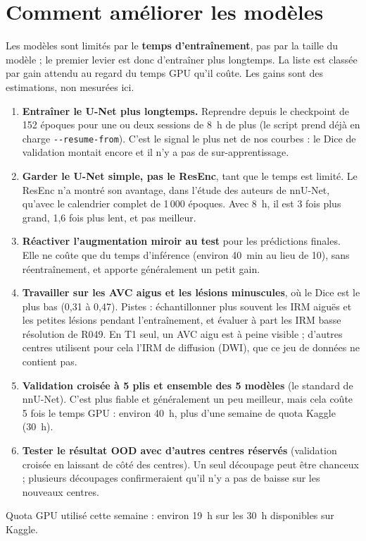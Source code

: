 \section{Comment améliorer les modèles}
\label{sec:anas-ameliorations}

Les modèles sont limités par le \textbf{temps d'entraînement}, pas par la taille du modèle ; le premier levier est donc d'entraîner plus longtemps.
La liste est classée par gain attendu au regard du temps GPU qu'il coûte.
Les gains sont des estimations, non mesurées ici.

\begin{enumerate}
  \item \textbf{Entraîner le U-Net plus longtemps.} Reprendre depuis le checkpoint de 152 époques pour une ou deux sessions de 8~h de plus (le script prend déjà en charge \texttt{-{}-resume-from}). C'est le signal le plus net de nos courbes : le Dice de validation montait encore et il n'y a pas de sur-apprentissage.
  \item \textbf{Garder le U-Net simple, pas le ResEnc}, tant que le temps est limité. Le ResEnc n'a montré son avantage, dans l'étude des auteurs de nnU-Net, qu'avec le calendrier complet de 1\,000 époques. Avec 8~h, il est 3 fois plus grand, 1,6 fois plus lent, et pas meilleur.
  \item \textbf{Réactiver l'augmentation miroir au test} pour les prédictions finales. Elle ne coûte que du temps d'inférence (environ 40~min au lieu de 10), sans réentraînement, et apporte généralement un petit gain.
  \item \textbf{Travailler sur les AVC aigus et les lésions minuscules}, où le Dice est le plus bas (0,31 à 0,47). Pistes : échantillonner plus souvent les IRM aiguës et les petites lésions pendant l'entraînement, et évaluer à part les IRM basse résolution de R049. En T1 seul, un AVC aigu est à peine visible ; d'autres centres utilisent pour cela l'IRM de diffusion (DWI), que ce jeu de données ne contient pas.
  \item \textbf{Validation croisée à 5 plis et ensemble des 5 modèles} (le standard de nnU-Net). C'est plus fiable et généralement un peu meilleur, mais cela coûte 5 fois le temps GPU : environ 40~h, plus d'une semaine de quota Kaggle (30~h).
  \item \textbf{Tester le résultat OOD avec d'autres centres réservés} (validation croisée en laissant de côté des centres). Un seul découpage peut être chanceux ; plusieurs découpages confirmeraient qu'il n'y a pas de baisse sur les nouveaux centres.
\end{enumerate}

Quota GPU utilisé cette semaine : environ 19~h sur les 30~h disponibles sur Kaggle.
